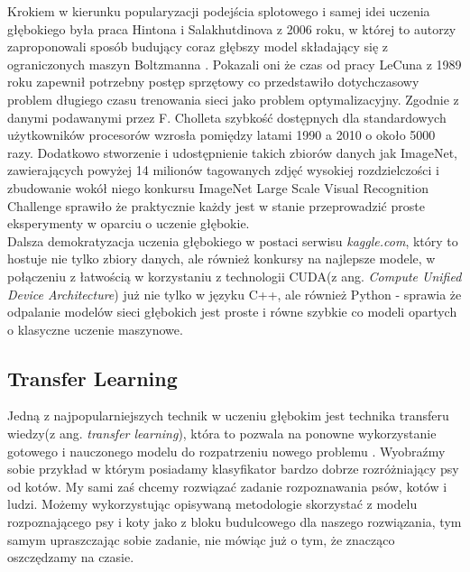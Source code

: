 Krokiem w kierunku popularyzacji podejścia splotowego i samej idei uczenia głębokiego była praca Hintona i Salakhutdinova z 2006 roku, w której to autorzy zaproponowali sposób budujący coraz głębszy model składający
się z ograniczonych maszyn Boltzmanna \cite{hinton}. Pokazali oni że czas od pracy LeCuna z 1989 roku \cite{lecun} zapewnił potrzebny postęp sprzętowy co przedstawiło dotychczasowy problem długiego czasu trenowania sieci jako problem optymalizacyjny. Zgodnie z danymi podawanymi przez F. Cholleta \cite{deep} szybkość dostępnych dla standardowych użytkowników procesorów wzrosła pomiędzy latami 1990 a 2010 o około 5000 razy. Dodatkowo stworzenie i udostępnienie takich zbiorów danych jak ImageNet, zawierających powyżej 14 milionów tagowanych zdjęć wysokiej rozdzielczości i zbudowanie wokół niego konkursu ImageNet Large Scale Visual Recognition Challenge \cite{imagenet} sprawiło że praktycznie każdy jest w stanie przeprowadzić proste eksperymenty w oparciu o uczenie głębokie. \\

Dalsza demokratyzacja uczenia głębokiego w postaci serwisu \textit{kaggle.com}, który to hostuje nie tylko zbiory danych, ale również konkursy na najlepsze modele, w połączeniu z łatwością w korzystaniu z technologii CUDA(z ang. \textit{Compute Unified Device Architecture}) już nie tylko w języku C++, ale również Python - sprawia że odpalanie modelów sieci głębokich jest proste i równe szybkie co modeli opartych o klasyczne uczenie maszynowe\cite{deep}.

\subsection{Transfer Learning}

Jedną z najpopularniejszych technik w uczeniu głębokim jest technika transferu wiedzy(z ang. \textit{transfer learning}), która to pozwala na ponowne wykorzystanie gotowego i nauczonego modelu do rozpatrzeniu nowego problemu \cite{hands_on}. Wyobraźmy sobie przykład w którym posiadamy klasyfikator bardzo dobrze rozróżniający psy od kotów. My sami zaś chcemy rozwiązać zadanie rozpoznawania psów, kotów i ludzi. Możemy wykorzystując opisywaną metodologie skorzystać z modelu rozpoznającego psy i koty jako z bloku budulcowego dla naszego rozwiązania, tym samym upraszczając sobie zadanie, nie mówiąc już o tym, że znacząco oszczędzamy na czasie. \\

